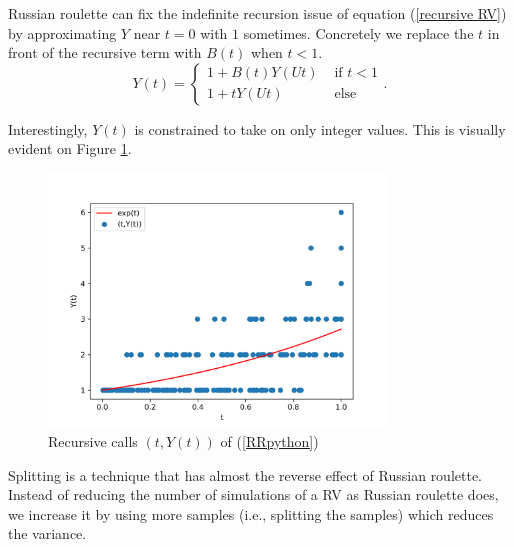 \documentclass[a4paper,12pt]{article}
\begin{document}
\begin{example}
    Russian roulette can fix the indefinite recursion issue of
    equation (\ref{recursive RV}) by approximating $Y$ near $t = 0$ with $1$
    sometimes. Concretely
    we replace the $t$ in front of the recursive term with $B(t)$
    when $t<1$.
    \begin{equation}
        Y(t) =
        \begin{cases}
            1 + B(t)Y(Ut) & \text{ if } t<1 \\
            1 + tY(Ut)    & \text{ else}
        \end{cases}.
    \end{equation}
\end{example}

\vspace{0.2cm}

\begin{pythonn} \label{RRpython}
    Interestingly, $Y(t)$ is constrained to take on only integer values.
    This is visually evident on Figure \ref{fig:russian roulette}.
    \begin{figure}[h!]
        \centering
        \includegraphics[width=0.8\textwidth]{plots/russian roulette example.png}
        \caption{Recursive calls $(t,Y(t))$ of (\ref{RRpython}) }
        \label{fig:russian roulette}
    \end{figure}

\end{pythonn}

Splitting is a technique that has almost the reverse effect of Russian roulette.
Instead of reducing the number of simulations of a RV as Russian roulette does,
we increase it by using more samples (i.e., splitting the samples) which
reduces the variance.
\end{document}
